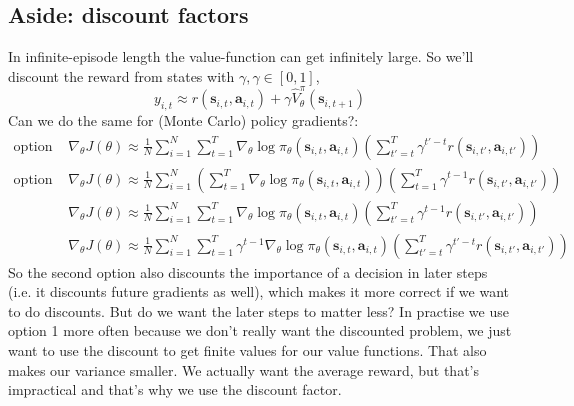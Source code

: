 \documentclass{report}
\begin{document}
\subsection{Aside: discount factors}
In infinite-episode length the value-function can get infinitely large.
So we'll discount the reward from states with $\gamma, \gamma \in [0,1]$,
\begin{equation}
		y_{i,t} \approx r(\bm{s}_{i,t}, \bm{a}_{i,t}) + \gamma \hat{V}^\pi_\theta(\bm{s}_{i, t+1})
\end{equation}
Can we do the same for (Monte Carlo) policy gradients?:
\begin{align}
\text{option 1: } & \nabla_\theta J(\theta) \approx \frac{1}{N} \sum_{i=1}^{N} \sum_{t=1}^{T} \nabla_{\theta} \log \pi_\theta(\bm{s}_{i,t}, \bm{a}_{i,t})
\left( \sum_{t'=t}^{T} \gamma^{t'-t} r(\bm{s}_{i,t'}, \bm{a}_{i,t'}) \right) \\ 
\text{option 2: } & \nabla_\theta J(\theta) \approx \frac{1}{N} \sum_{i=1}^{N}  \left( \sum_{t=1}^{T} \nabla_{\theta} \log \pi_\theta(\bm{s}_{i,t}, \bm{a}_{i,t}) \right)
\left( \sum_{t=1}^{T} \gamma^{t-1} r(\bm{s}_{i,t'}, \bm{a}_{i,t'}) \right) \\
				  &
\nabla_\theta J(\theta) \approx \frac{1}{N} \sum_{i=1}^{N}   \sum_{t=1}^{T} \nabla_{\theta} \log \pi_\theta(\bm{s}_{i,t}, \bm{a}_{i,t}) 
\left( \sum_{t'=t}^{T} \gamma^{t-1} r(\bm{s}_{i,t'}, \bm{a}_{i,t'}) \right)\\
				  &
				  \nabla_\theta J(\theta) \approx \frac{1}{N} \sum_{i=1}^{N}   \sum_{t=1}^{T} \gamma^{t-1} \nabla_{\theta} \log \pi_\theta(\bm{s}_{i,t}, \bm{a}_{i,t}) 
\left( \sum_{t'=t}^{T} \gamma^{t'-t} r(\bm{s}_{i,t'}, \bm{a}_{i,t'}) \right)
\end{align}
So the second option also discounts the importance of a decision in later steps (i.e. it discounts future gradients as well),
which makes it more correct if we want to do discounts.
But do we want the later steps to matter less?
In practise we use option 1 more often  because we don't really want the discounted problem,
we just want to use the discount to get finite values for our value functions.
That also makes our variance smaller.
We actually want the average reward, but that's impractical and that's why we use the discount factor.

\end{document}
